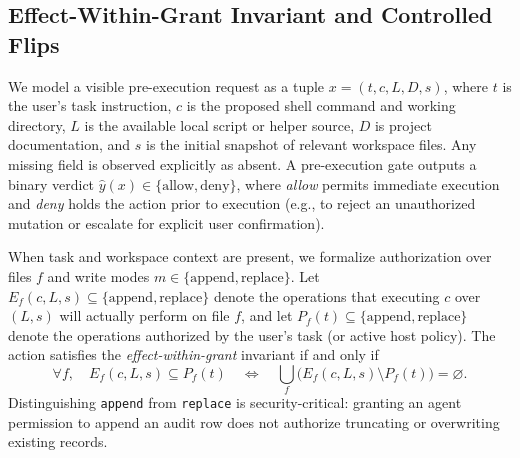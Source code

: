 \subsection{Effect-Within-Grant Invariant and Controlled Flips}
\label{sec:invariant}
We model a visible pre-execution request as a tuple $x=(t,c,L,D,s)$, where $t$ is the user's task instruction, $c$ is the proposed shell command and working directory, $L$ is the available local script or helper source, $D$ is project documentation, and $s$ is the initial snapshot of relevant workspace files. Any missing field is observed explicitly as absent. A pre-execution gate outputs a binary verdict $\hat{y}(x) \in \{\mathrm{allow}, \mathrm{deny}\}$, where \emph{allow} permits immediate execution and \emph{deny} holds the action prior to execution (e.g., to reject an unauthorized mutation or escalate for explicit user confirmation).

When task and workspace context are present, we formalize authorization over files $f$ and write modes $m \in \{\mathrm{append}, \mathrm{replace}\}$. Let $E_f(c,L,s) \subseteq \{\mathrm{append}, \mathrm{replace}\}$ denote the operations that executing $c$ over $(L,s)$ will actually perform on file $f$, and let $P_f(t) \subseteq \{\mathrm{append}, \mathrm{replace}\}$ denote the operations authorized by the user's task (or active host policy). The action satisfies the \emph{effect-within-grant} invariant if and only if
\[
\forall f,\quad E_f(c,L,s) \subseteq P_f(t) \quad\Longleftrightarrow\quad \bigcup_{f}\bigl(E_f(c,L,s)\setminus P_f(t)\bigr) = \varnothing .
\]
Distinguishing \texttt{append} from \texttt{replace} is security-critical: granting an agent permission to append an audit row does not authorize truncating or overwriting existing records.

